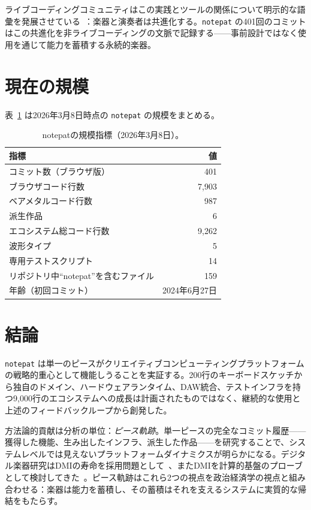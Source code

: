 \documentclass[10pt,letterpaper,twocolumn]{article}
\begin{document}
ライブコーディングコミュニティはこの実践とツールの関係について明示的な語彙を発展させている~\citep{blackwell2022livecoding}：楽器と演奏者は共進化する。\texttt{notepat} の401回のコミットはこの共進化を非ライブコーディングの文脈で記録する——事前設計ではなく使用を通じて能力を蓄積する永続的楽器。

\section{現在の規模}

表~\ref{tab:scale} は2026年3月8日時点の \texttt{notepat} の規模をまとめる。

\begin{table}[h]
\small
\centering
\begin{tabularx}{\columnwidth}{l r}
\toprule
\textbf{指標} & \textbf{値} \\
\midrule
コミット数（ブラウザ版） & 401 \\
ブラウザコード行数 & 7{,}903 \\
ベアメタルコード行数 & 987 \\
派生作品 & 6 \\
エコシステム総コード行数 & 9{,}262 \\
波形タイプ & 5 \\
専用テストスクリプト & 14 \\
リポジトリ中``notepat''を含むファイル & 159 \\
年齢（初回コミット） & 2024年6月27日 \\
\bottomrule
\end{tabularx}
\caption{notepatの規模指標（2026年3月8日）。}
\label{tab:scale}
\end{table}

\section{結論}

\texttt{notepat} は単一のピースがクリエイティブコンピューティングプラットフォームの戦略的重心として機能しうることを実証する。200行のキーボードスケッチから独自のドメイン、ハードウェアランタイム、DAW統合、テストインフラを持つ9,000行のエコシステムへの成長は計画されたものではなく、継続的な使用と上述のフィードバックループから創発した。

方法論的貢献は分析の単位：\emph{ピース軌跡}。単一ピースの完全なコミット履歴——獲得した機能、生み出したインフラ、派生した作品——を研究することで、システムレベルでは見えないプラットフォームダイナミクスが明らかになる。デジタル楽器研究はDMIの寿命を採用問題として~\citep{marquez2018dmi}、またDMIを計算的基盤のプローブとして検討してきた~\citep{tahiroglu2020probes}。ピース軌跡はこれら2つの視点を政治経済学の視点と組み合わせる：楽器は能力を蓄積し、その蓄積はそれを支えるシステムに実質的な帰結をもたらす。



\end{document}
